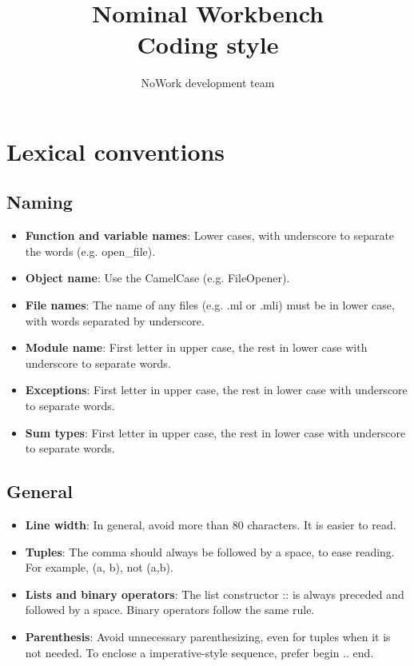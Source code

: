 \documentclass[12pt,a4paper]{article}
\title{Nominal Workbench \\
  Coding style}
\author{NoWork development team\\[2em]}
\begin{document}
\maketitle

\section{Lexical conventions}

\subsection{Naming}

\medskip

\begin{itemize}
\item \textbf{Function and variable names}: Lower cases, with underscore to 
  separate the words (e.g. open\_file).
\item \textbf{Object name}: Use the CamelCase (e.g. FileOpener).
\item \textbf{File names}: The name of any files (e.g. .ml or .mli) must be in
  lower case, with words separated by underscore.
\item \textbf{Module name}: First letter in upper case, the rest in lower case
  with underscore to separate words.
\item \textbf{Exceptions}: First letter in upper case, the rest in
  lower case with underscore to separate words.
\item \textbf{Sum types}: First letter in upper case, the rest in lower case
  with underscore to separate words.
\end{itemize}

\subsection{General}

\medskip 

\begin{itemize}
\item \textbf{Line width}: In general, avoid more than 80 characters. It is
  easier to read.
\item \textbf{Tuples}: The comma should always be followed by a space, to ease
  reading. For example, \textsf{(a, b)}, not \textsf{(a,b)}.
\item \textbf{Lists and binary operators}: The list constructor \textsf{::} is
  always preceded and followed by a space. Binary operators follow the same
  rule.
\item \textbf{Parenthesis}: Avoid unnecessary parenthesizing, even for tuples when
  it is not needed. To enclose a imperative-style sequence, prefer \textsf{begin
    .. end}.
\end{itemize}
\end{document}

